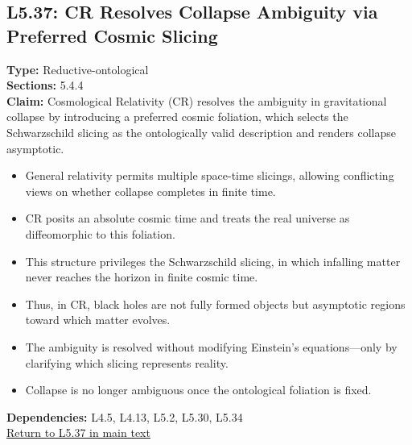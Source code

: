 \documentclass[12pt]{book}
\newcommand{\returnlink}[1]{\hyperref[logic:#1]{Return to #1 in main text}\xspace}
\begin{document}
\subsection*{L5.37: CR Resolves Collapse Ambiguity via Preferred Cosmic Slicing}
\label{appendix:L5.37}
\textbf{Type:} Reductive-ontological \\
\textbf{Sections:} 5.4.4 \\
\textbf{Claim:} Cosmological Relativity (CR) resolves the ambiguity in gravitational collapse by introducing a preferred cosmic foliation, which selects the Schwarzschild slicing as the ontologically valid description and renders collapse asymptotic.
\begin{itemize}
  \item General relativity permits multiple space-time slicings, allowing conflicting views on whether collapse completes in finite time.
  \item CR posits an absolute cosmic time and treats the real universe as diffeomorphic to this foliation.
  \item This structure privileges the Schwarzschild slicing, in which infalling matter never reaches the horizon in finite cosmic time.
  \item Thus, in CR, black holes are not fully formed objects but asymptotic regions toward which matter evolves.
  \item The ambiguity is resolved without modifying Einstein's equations---only by clarifying which slicing represents reality.
  \item Collapse is no longer ambiguous once the ontological foliation is fixed.
\end{itemize}
\textbf{Dependencies:} L4.5, L4.13, L5.2, L5.30, L5.34 \\
\returnlink{L5.37}
\end{document}
